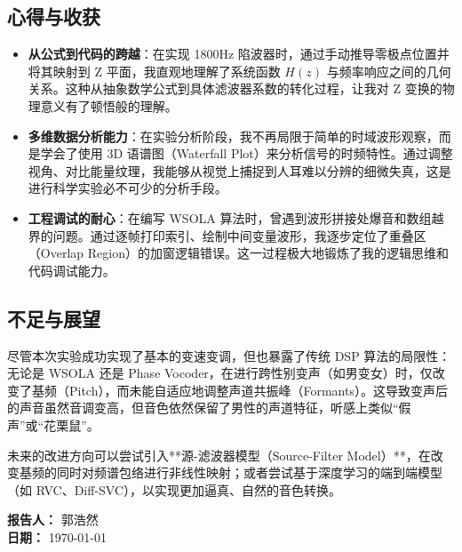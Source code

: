 \documentclass[12pt]{ctexart}
\begin{document}
\subsection{心得与收获}
\begin{itemize}
    \item \textbf{从公式到代码的跨越}：在实现 1800Hz 陷波器时，通过手动推导零极点位置并将其映射到 Z 平面，我直观地理解了系统函数 $H(z)$ 与频率响应之间的几何关系。这种从抽象数学公式到具体滤波器系数的转化过程，让我对 Z 变换的物理意义有了顿悟般的理解。
    \item \textbf{多维数据分析能力}：在实验分析阶段，我不再局限于简单的时域波形观察，而是学会了使用 3D 语谱图（Waterfall Plot）来分析信号的时频特性。通过调整视角、对比能量纹理，我能够从视觉上捕捉到人耳难以分辨的细微失真，这是进行科学实验必不可少的分析手段。
    \item \textbf{工程调试的耐心}：在编写 WSOLA 算法时，曾遇到波形拼接处爆音和数组越界的问题。通过逐帧打印索引、绘制中间变量波形，我逐步定位了重叠区（Overlap Region）的加窗逻辑错误。这一过程极大地锻炼了我的逻辑思维和代码调试能力。
\end{itemize}

\subsection{不足与展望}
尽管本次实验成功实现了基本的变速变调，但也暴露了传统 DSP 算法的局限性：无论是 WSOLA 还是 Phase Vocoder，在进行跨性别变声（如男变女）时，仅改变了基频（Pitch），而未能自适应地调整声道共振峰（Formants）。这导致变声后的声音虽然音调变高，但音色依然保留了男性的声道特征，听感上类似“假声”或“花栗鼠”。

未来的改进方向可以尝试引入**源-滤波器模型（Source-Filter Model）**，在改变基频的同时对频谱包络进行非线性映射；或者尝试基于深度学习的端到端模型（如 RVC、Diff-SVC），以实现更加逼真、自然的音色转换。

\vspace{2cm}

\begin{flushright}
    \textbf{报告人：} 郭浩然 \\
    \textbf{日期：} \today
\end{flushright}
\end{document}

